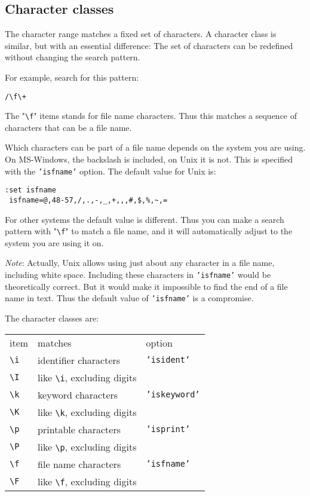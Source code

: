 \subsection{Character classes}
The character range matches a fixed set of characters.
A character class is similar, but with an essential difference: The set of characters can be redefined without changing the search pattern.

For example, search for this pattern:

\begin{Verbatim}[samepage=true]
 /\f\+
\end{Verbatim}

The "\texttt{\textbackslash{}f}" items stands for file name characters.
Thus this matches a sequence of characters that can be a file name.

Which characters can be part of a file name depends on the system you are using.
On MS-Windows, the backslash is included, on Unix it is not.
This is specified with the \texttt{'isfname'} option.
The default value for Unix is:

\begin{Verbatim}[samepage=true]
 :set isfname
 isfname=@,48-57,/,.,-,_,+,,,#,$,%,~,=
\end{Verbatim}

For other systems the default value is different.
Thus you can make a search pattern with "\texttt{\textbackslash{}f}" to match a file name, and it will automatically adjust to the system you are using it on.

\emph{Note}: Actually, Unix allows using just about any character in a file name, including white space.
Including these characters in \texttt{'isfname'} would be theoretically correct.
But it would make it impossible to find the end of a file name in text.
Thus the default value of \texttt{'isfname'} is a compromise.

The character classes are:

\begin{center} \begin{tabular}{l l l}
				item & matches & option \\
				\texttt{\textbackslash{}i} & identifier characters & \texttt{'isident'} \\
				\texttt{\textbackslash{}I} & like \texttt{\textbackslash{}i}, excluding digits & \\
				\texttt{\textbackslash{}k} & keyword characters & \texttt{'iskeyword'} \\
				\texttt{\textbackslash{}K} & like \texttt{\textbackslash{}k}, excluding digits & \\
				\texttt{\textbackslash{}p} & printable characters & \texttt{'isprint'} \\
				\texttt{\textbackslash{}P} & like \texttt{\textbackslash{}p}, excluding digits & \\
				\texttt{\textbackslash{}f} & file name characters & \texttt{'isfname'} \\
				\texttt{\textbackslash{}F} & like \texttt{\textbackslash{}f}, excluding digits & \\
\end{tabular} \end{center}
